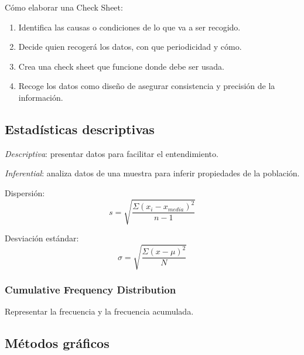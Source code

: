 \documentclass[]{article}
\begin{document}
Cómo elaborar una Check Sheet:

\begin{enumerate}
	\item Identifica las causas o condiciones de lo que va a ser recogido.
	\item Decide quien recogerá los datos, con que periodicidad y cómo.
	\item Crea una check sheet que funcione donde debe ser usada.
	\item Recoge los datos como diseño de asegurar consistencia y precisión de la información.
\end{enumerate}

\subsection{Estadísticas descriptivas}

\textit{Descriptiva}: presentar datos para facilitar el entendimiento.

\textit{Inferential}: analiza datos de una muestra para inferir propiedades de la población. 

Dispersión: 
\begin{equation}
s = \sqrt{\frac{\Sigma(x_i-x_{media})^2}{n-1}}
\end{equation}

Desviación estándar:
\begin{equation}
\sigma = \sqrt{\frac{\Sigma(x-\mu)^2}{N}}
\end{equation}

\subsubsection{Cumulative Frequency Distribution}

Representar la frecuencia y la frecuencia acumulada.

\subsection{Métodos gráficos}
\end{document}

